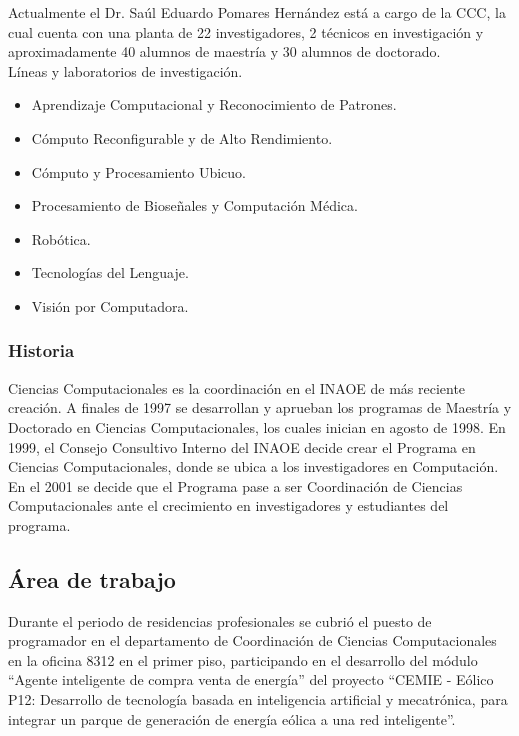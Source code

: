 Actualmente el Dr. Saúl Eduardo Pomares Hernández está a cargo de la CCC, la cual cuenta con una planta de 22 investigadores, 2 técnicos en investigación y aproximadamente  40 alumnos de maestría y 30 alumnos de doctorado.
\\
 
Líneas y laboratorios de investigación.
\begin{itemize}
   \item Aprendizaje Computacional y Reconocimiento de Patrones.
   \item Cómputo Reconfigurable y de Alto Rendimiento.
   \item Cómputo y Procesamiento Ubicuo.
   \item Procesamiento de Bioseñales y Computación Médica.
   \item Robótica.
   \item Tecnologías del Lenguaje.
   \item Visión por Computadora.
\end{itemize}

\subsubsection{Historia}

Ciencias Computacionales es la coordinación en el INAOE de más reciente creación. A finales de 1997 se desarrollan y aprueban los programas de Maestría y Doctorado en Ciencias Computacionales, los cuales inician en agosto de 1998. En 1999, el Consejo Consultivo Interno del INAOE decide crear el Programa en Ciencias Computacionales, donde se ubica a los investigadores en Computación. En el 2001 se decide que el Programa pase a ser Coordinación de Ciencias Computacionales ante el crecimiento en investigadores y estudiantes del programa.

\subsection{Área de trabajo}

Durante el periodo de residencias profesionales se cubrió el puesto de programador en el departamento de Coordinación de Ciencias Computacionales en la oficina 8312 en el primer piso, participando en el desarrollo del módulo ``Agente inteligente de compra venta de energía'' del proyecto ``CEMIE - Eólico P12: Desarrollo de tecnología basada en inteligencia artificial y mecatrónica, para integrar un parque de generación de energía eólica a una red inteligente''.
\\

